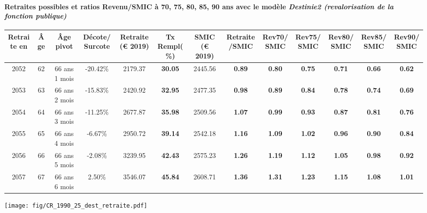 \paragraph{Retraites possibles et ratios Revenu/SMIC à 70, 75, 80, 85, 90 ans avec le modèle \emph{Destinie2 (revalorisation de la fonction publique)}}  
 
{ \scriptsize \begin{center} 
\begin{tabular}[htb]{|c|c||c|c||c|c||c||c|c|c|c|c|c|} 
\hline 
 Retraite en &  Âge &  Âge pivot &  Décote/Surcote &  Retraite (\euro{} 2019) &  Tx Rempl(\%) &  SMIC (\euro{} 2019) &  Retraite/SMIC &  Rev70/SMIC &  Rev75/SMIC &  Rev80/SMIC &  Rev85/SMIC &  Rev90/SMIC \\ 
\hline \hline 
 2052 &  62 &  66 ans 1 mois &  -20.42\% &  2179.37 &  {\bf 30.05} &  2445.56 &  {\bf {\color{red} 0.89}} &  {\bf {\color{red} 0.80}} &  {\bf {\color{red} 0.75}} &  {\bf {\color{red} 0.71}} &  {\bf {\color{red} 0.66}} &  {\bf {\color{red} 0.62}} \\ 
\hline 
 2053 &  63 &  66 ans 2 mois &  -15.83\% &  2420.92 &  {\bf 32.95} &  2477.35 &  {\bf {\color{red} 0.98}} &  {\bf {\color{red} 0.89}} &  {\bf {\color{red} 0.84}} &  {\bf {\color{red} 0.78}} &  {\bf {\color{red} 0.74}} &  {\bf {\color{red} 0.69}} \\ 
\hline 
 2054 &  64 &  66 ans 3 mois &  -11.25\% &  2677.87 &  {\bf 35.98} &  2509.56 &  {\bf 1.07} &  {\bf {\color{red} 0.99}} &  {\bf {\color{red} 0.93}} &  {\bf {\color{red} 0.87}} &  {\bf {\color{red} 0.81}} &  {\bf {\color{red} 0.76}} \\ 
\hline 
 2055 &  65 &  66 ans 4 mois &  -6.67\% &  2950.72 &  {\bf 39.14} &  2542.18 &  {\bf 1.16} &  {\bf 1.09} &  {\bf 1.02} &  {\bf {\color{red} 0.96}} &  {\bf {\color{red} 0.90}} &  {\bf {\color{red} 0.84}} \\ 
\hline 
 2056 &  66 &  66 ans 5 mois &  -2.08\% &  3239.95 &  {\bf 42.43} &  2575.23 &  {\bf 1.26} &  {\bf 1.19} &  {\bf 1.12} &  {\bf 1.05} &  {\bf {\color{red} 0.98}} &  {\bf {\color{red} 0.92}} \\ 
\hline 
 2057 &  67 &  66 ans 6 mois &  2.50\% &  3546.07 &  {\bf 45.84} &  2608.71 &  {\bf 1.36} &  {\bf 1.31} &  {\bf 1.23} &  {\bf 1.15} &  {\bf 1.08} &  {\bf 1.01} \\ 
\hline 
\hline 
\end{tabular} 
\end{center} } 

 \begin{center}\texttt{[image: fig/CR\_1990\_25\_dest\_retraite.pdf]}\end{center} \label{fig/CR_1990_25_dest_retraite.pdf} 

